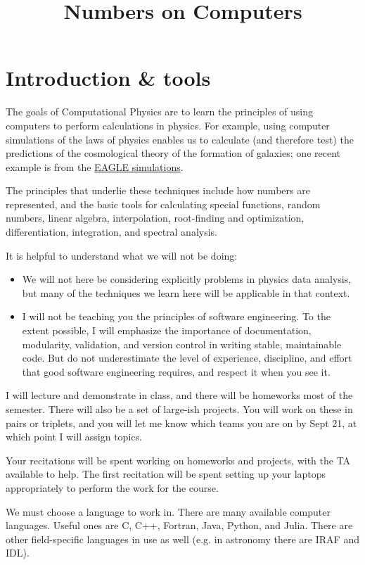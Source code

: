 \title{Numbers on Computers}

\section{Introduction \& tools}

The goals of Computational Physics are to learn the principles of
using computers to perform calculations in physics.  For example,
using computer simulations of the laws of physics enables us to
calculate (and therefore test) the predictions of the cosmological
theory of the formation of galaxies; one recent example is from the
\href{https://vimeo.com/93020014}{EAGLE simulations}.

The principles that underlie these techniques include how numbers are
represented, and the basic tools for calculating special functions,
random numbers, linear algebra, interpolation, root-finding and
optimization, differentiation, integration, and spectral analysis.

It is helpful to understand what we will not be doing:
\begin{itemize}
\item We will not here be considering explicitly problems in physics
  data analysis, but many of the techniques we learn here will be
  applicable in that context.
\item I will not be teaching you the principles of software
  engineering. To the extent possible, I will emphasize the importance
  of documentation, modularity, validation, and version control in
  writing stable, maintainable code. But do not underestimate the
  level of experience, discipline, and effort that good software
  engineering requires, and respect it when you see it.
\end{itemize}

I will lecture and demonstrate in class, and there will be homeworks
most of the semester. There will also be a set of large-ish
projects. You will work on these in pairs or triplets, and you will
let me know which teams you are on by Sept 21, at which point I will
assign topics.

Your recitations will be spent working on homeworks and projects, with
the TA available to help. The first recitation will be spent setting
up your laptops appropriately to perform the work for the course.

We must choose a language to work in. There are many available
computer languages. Useful ones are C, C++, Fortran, Java, Python, and
Julia. There are other field-specific languages in use as well
(e.g. in astronomy there are IRAF and IDL).

